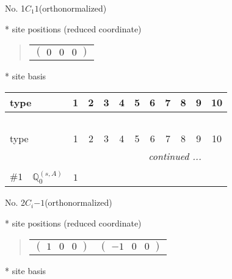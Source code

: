 \documentclass[fleqn,9pt,landscape]{jsarticle}
\begin{document}
\setcounter{MaxMatrixCols}{32}

\begin{center}
\LARGE
No. 1\quad$C_{1}$\quad$1$\quad[ triclinic ] (orthonormalized)
\end{center}
\vspace{5mm}
* site positions (reduced coordinate)
\begin{quote}
\begin{tabular}{c}
$ \begin{pmatrix} 0 & 0 & 0 \end{pmatrix} $
\end{tabular}
\end{quote}
* site basis
\begin{center}
\renewcommand{\arraystretch}{1.3}
\begin{longtable}{lcccccccccc}
 \hline \hline
type & 1 & 2 & 3 & 4 & 5 & 6 & 7 & 8 & 9 & 10 \\ \hline \endfirsthead

\multicolumn{10}{l}{\tablename\ \thetable{}} \\
 \hline \hline
type & 1 & 2 & 3 & 4 & 5 & 6 & 7 & 8 & 9 & 10 \\ \hline \endhead

 \hline \hline
\multicolumn{10}{r}{\footnotesize\it continued ...} \\ \endfoot

 \hline \hline
\multicolumn{10}{r}{} \\ \endlastfoot

$ \#1\quad \mathbb{Q}_{0}^{(s,A)} $ & $ 1 $ \\
\end{longtable}
\end{center}
\newpage
\begin{center}
\LARGE
No. 2\quad$C_{i}$\quad$-1$\quad[ triclinic ] (orthonormalized)
\end{center}
\vspace{5mm}
* site positions (reduced coordinate)
\begin{quote}
\begin{tabular}{cc}
$ \begin{pmatrix} 1 & 0 & 0 \end{pmatrix} $ & $ \begin{pmatrix} -1 & 0 & 0 \end{pmatrix} $
\end{tabular}
\end{quote}
* site basis
\end{document}
